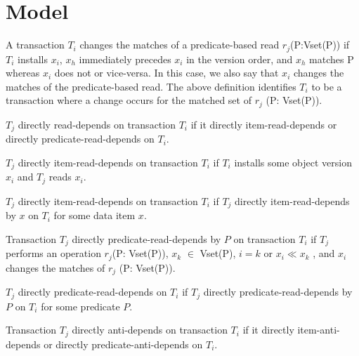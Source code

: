 
\normalsize

\section{Model}

\begin{definition}
A transaction $T_i$ changes the matches
of a predicate-based read $r_j$(P:Vset(P)) if $T_i$ installs $x_i$, $x_h$
immediately precedes $x_i$ in the version order, and $x_h$ matches
P whereas $x_i$ does not or vice-versa. In this case, we also
say that $x_i$ changes the matches of the predicate-based read.
The above deﬁnition identiﬁes $T_i$ to be a transaction where
a change occurs for the matched set of $r_j$ (P: Vset(P)).
\end{definition}

\begin{definition}
$T_j$ directly read-depends on transaction $T_i$ if it directly
item-read-depends or directly predicate-read-depends on $T_i$.
\end{definition}

\begin{definition}
$T_j$ directly item-read-depends on transaction $T_i$ if $T_i$ installs some
  object version $x_i$ and $T_j$ reads $x_i$.
\end{definition}

\begin{definition}
$T_j$ directly item-read-depends on transaction $T_i$ if $T_j$
  directly item-read-depends by $x$ on $T_i$ for some data item $x$.
\end{definition}

\begin{definition}
Transaction $T_j$ directly predicate-read-depends by $P$ on
transaction $T_i$ if $T_j$ performs an operation $r_j$(P: Vset(P)),
$x_k$ $\in$ Vset(P), $i = k$ or $x_i \ll x_k$ , and $x_i$ changes the
matches of $r_j$ (P: Vset(P)).
\end{definition}

\begin{definition}
$T_j$ directly predicate-read-depends on $T_i$ if $T_j$ directly
  predicate-read-depends by $P$ on $T_i$ for some predicate $P$.
\end{definition}

\begin{definition}
Transaction $T_j$ directly anti-depends on transaction $T_i$ if it
directly item-anti-depends or directly predicate-anti-depends on
$T_i$.
\end{definition}

